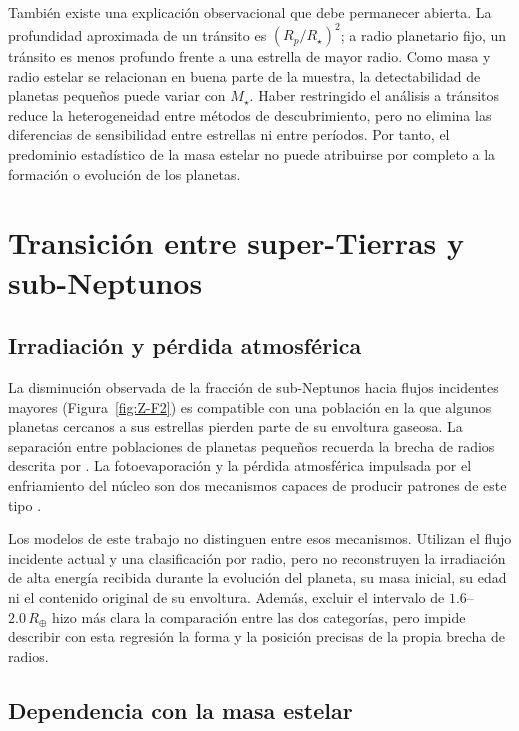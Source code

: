 También existe una explicación observacional que debe permanecer abierta. La profundidad aproximada de un tránsito es $(R_p/R_\star)^2$; a radio planetario fijo, un tránsito es menos profundo frente a una estrella de mayor radio. Como masa y radio estelar se relacionan en buena parte de la muestra, la detectabilidad de planetas pequeños puede variar con $M_\star$. Haber restringido el análisis a tránsitos reduce la heterogeneidad entre métodos de descubrimiento, pero no elimina las diferencias de sensibilidad entre estrellas ni entre períodos. Por tanto, el predominio estadístico de la masa estelar no puede atribuirse por completo a la formación o evolución de los planetas.

\section{Transición entre super-Tierras y sub-Neptunos}
\label{sec:dis-transicion}

\subsection{Irradiación y pérdida atmosférica}
\label{sec:dis-irradiacion}

La disminución observada de la fracción de sub-Neptunos hacia flujos incidentes mayores (Figura~\ref{fig:Z-F2}) es compatible con una población en la que algunos planetas cercanos a sus estrellas pierden parte de su envoltura gaseosa. La separación entre poblaciones de planetas pequeños recuerda la brecha de radios descrita por \textcite{fulton2017}. La fotoevaporación y la pérdida atmosférica impulsada por el enfriamiento del núcleo son dos mecanismos capaces de producir patrones de este tipo \parencite{owen2017,gupta2020}.

Los modelos de este trabajo no distinguen entre esos mecanismos. Utilizan el flujo incidente actual y una clasificación por radio, pero no reconstruyen la irradiación de alta energía recibida durante la evolución del planeta, su masa inicial, su edad ni el contenido original de su envoltura. Además, excluir el intervalo de $1.6$--$2.0\,R_\oplus$ hizo más clara la comparación entre las dos categorías, pero impide describir con esta regresión la forma y la posición precisas de la propia brecha de radios.

\subsection{Dependencia con la masa estelar}
\label{sec:dis-interaccion}

